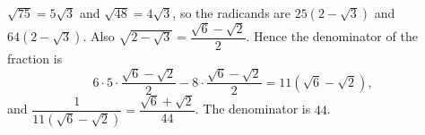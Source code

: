 $\sqrt{75}=5\sqrt3$ and $\sqrt{48}=4\sqrt3$, so the radicands are $25\left(2-\sqrt3\right)$ and $64\left(2-\sqrt3\right)$. Also $\sqrt{2-\sqrt3}=\dfrac{\sqrt6-\sqrt2}{2}$. Hence the denominator of the fraction is
\[6\cdot5\cdot\dfrac{\sqrt6-\sqrt2}{2}-8\cdot\dfrac{\sqrt6-\sqrt2}{2}=11\left(\sqrt6-\sqrt2\right),\]
and $\dfrac{1}{11\left(\sqrt6-\sqrt2\right)}=\dfrac{\sqrt6+\sqrt2}{44}$. The denominator is $\boxed{44}$.
